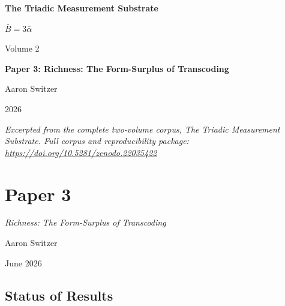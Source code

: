 \documentclass[11pt,oneside]{report}
\theoremstyle{definition}
\theoremstyle{remark}
\begin{document}
\thispagestyle{empty}
\begin{titlepage}
\centering
\vspace*{2cm}
{\sffamily\bfseries\Large The Triadic Measurement Substrate\par}
\vspace{0.6cm}
{\large $\bar{B} = 3\bar{\alpha}$\par}
\vspace{1cm}
{\sffamily\large Volume 2\par}
\vspace{1.4cm}
{\Large \bfseries Paper 3: Richness: The Form-Surplus of Transcoding\par}
\vfill
{\large Aaron Switzer\par}
\vspace{0.4cm}
{\large 2026\par}
\vspace{1.2cm}
{\small\itshape Excerpted from the complete two-volume corpus, \emph{The Triadic Measurement Substrate}. Full corpus and reproducibility package: \url{https://doi.org/10.5281/zenodo.22035422}\par}
\end{titlepage}
\cleardoublepage
{}

\chapter*{Paper 3}
\begingroup\centering
{\large\itshape Richness: The Form-Surplus of Transcoding\par}\vspace{0.8em}
{\normalsize Aaron Switzer\par}
{\small June 2026\par}
\endgroup\vspace{1.0em}

\par\vspace{0.6em}

\section*{Status of Results}
\end{document}
